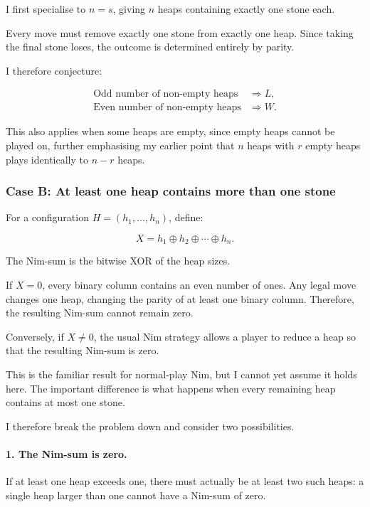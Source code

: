 \documentclass[11pt]{article}
\newcommand{\keywordfont}{\textsc}
\newcommand{\keyword}[1]{%
  \marginpar{\raggedright\small\keywordfont{#1}}}
\begin{document}
I first specialise to $n=s$, giving $n$ heaps containing exactly one stone each.

Every move must remove exactly one stone from exactly one heap. Since taking the final stone loses, the outcome is determined entirely by parity.

I therefore conjecture:

\[
\boxed{
\begin{aligned}
\text{Odd number of non-empty heaps}&\Rightarrow L,\\
\text{Even number of non-empty heaps}&\Rightarrow W.
\end{aligned}
}
\]

This also applies when some heaps are empty, since empty heaps cannot be played on, further emphasising my earlier point that $n$ heaps with $r$ empty heaps plays identically to $n-r$ heaps.

\subsubsection{Case B: At least one heap contains more than one stone}

For a configuration $H=(h_1,\ldots,h_n)$, define:

\[
X=h_1\oplus h_2\oplus\cdots\oplus h_n.
\]

The Nim-sum is the bitwise XOR of the heap sizes.

If $X=0$, every binary column contains an even number of ones. Any legal move changes one heap, changing the parity of at least one binary column. Therefore, the resulting Nim-sum cannot remain zero.

Conversely, if $X\neq 0$, the usual Nim strategy allows a player to reduce a heap so that the resulting Nim-sum is zero.


This is the familiar result \keyword{Pause} for normal-play Nim, but I cannot yet assume it holds here. The important difference is what happens when every remaining heap contains at most one stone.

I therefore break the problem down and consider two possibilities.

\paragraph{1. The Nim-sum is zero.}

If at least one heap exceeds one, there must actually be at least two such heaps: a single heap larger than one cannot have a Nim-sum of zero.
\end{document}
